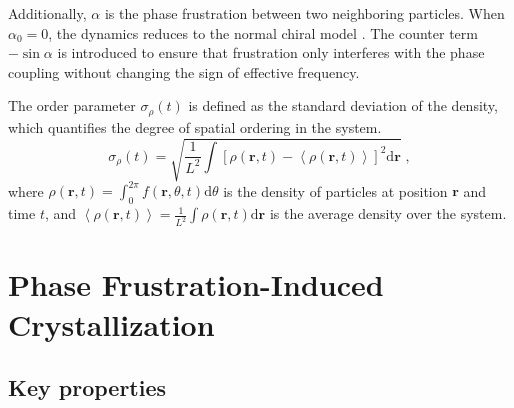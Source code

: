 \documentclass{article}
\begin{document}
Additionally, $\alpha$ is the phase frustration between two neighboring particles. When $\alpha_0=0$, the dynamics reduces to the normal chiral model \cite{LU2025115794}. 
The counter term $-\sin\alpha$ is introduced to ensure that frustration only interferes with the phase coupling without changing the sign of effective frequency. 

The order parameter $\sigma _{\rho}\left( t \right)$ is defined as the standard deviation of the density, which quantifies the degree of spatial ordering in the system.
\begin{equation}
    \sigma _{\rho}\left( t \right) =\sqrt{\frac{1}{L^2}\int{\left[ \rho \left( \mathbf{r},t \right) -\left< \rho \left( \mathbf{r},t \right) \right> \right] ^2\mathrm{d}\mathbf{r}}}\;,
\end{equation}
where $\rho \left( \mathbf{r},t \right) =\int_0^{2\pi}{f\left( \mathbf{r},\theta ,t \right) \mathrm{d}\theta}$ is the density of particles at position $\mathbf{r}$ and time $t$, and $\left< \rho \left( \mathbf{r},t \right) \right> =\frac{1}{L^2}\int{\rho \left( \mathbf{r},t \right) \mathrm{d}\mathbf{r}}$ is the average density over the system. 

\newpage
\section{Phase Frustration-Induced Crystallization}

\subsection{Key properties}
\end{document}
